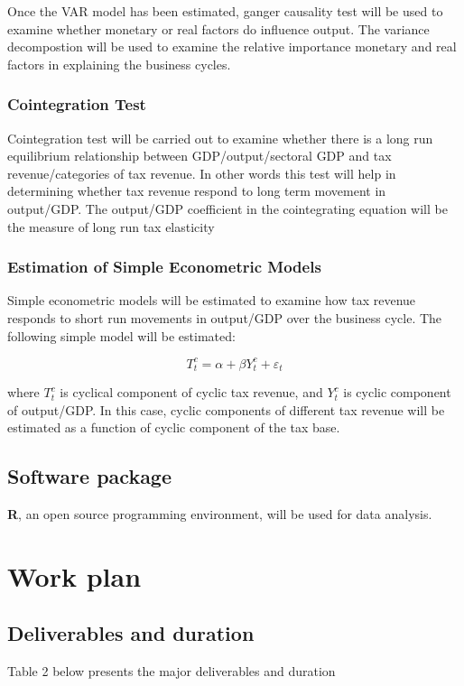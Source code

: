 \documentclass[12pt,a4paper,final]{article}
\begin{document}
Once the VAR model has been estimated, ganger causality test will be used to examine whether monetary or real factors do influence output. The variance decompostion will be used to examine the relative importance monetary and real factors in explaining the business cycles.

\subsubsection{Cointegration Test}

Cointegration test will be carried out to examine whether there is a long run equilibrium relationship between GDP/output/sectoral GDP and tax revenue/categories of tax revenue. In other words this test will help in determining whether tax revenue respond to long term movement in output/GDP. The output/GDP coefficient in the cointegrating equation will be the measure of long run tax elasticity

\subsubsection{Estimation of Simple Econometric Models}

Simple econometric models will be estimated to examine how tax revenue responds to short run movements in output/GDP over the business cycle. The following simple model will be estimated:

\[ T_t^c = \alpha + \beta Y_t^c + \varepsilon_t \]

where $T_t^c$ is cyclical component of cyclic tax revenue, and $Y_t^c$ is cyclic component of output/GDP. In this case, cyclic components of different tax revenue will be estimated as a function of cyclic component of the tax base.

\subsection{Software package}
\textbf{R}, an open source programming environment,  will be used for data analysis. 

\section{Work plan}

\subsection{Deliverables and duration}
Table 2 below presents the major deliverables and duration
\end{document}

